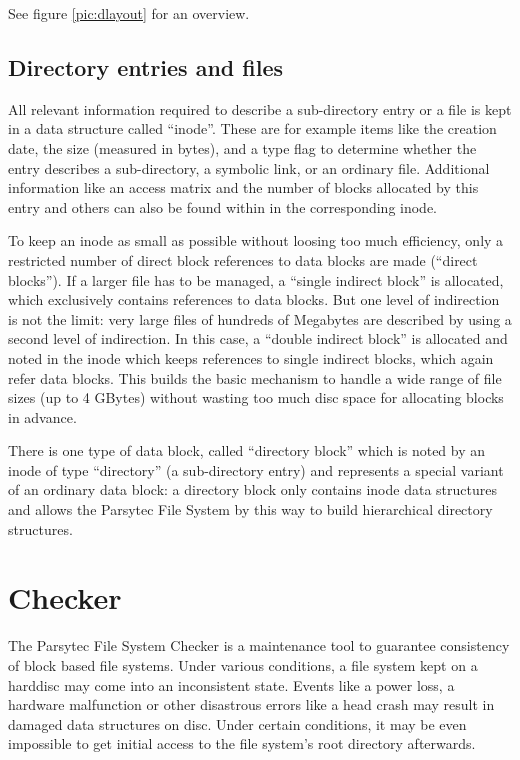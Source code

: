 See figure \ref{pic:dlayout} for an overview.



\subsection{Directory entries and files}

All relevant information required to describe a sub-directory entry or a file
is kept in a data structure called ``\/inode''. These are for
example items like the creation date, the size (measured in bytes), and a type
flag to determine whether the entry describes a sub-directory, a symbolic
link, or an ordinary file. Additional information like an access matrix and
the number of blocks allocated by this entry and others can also be found
within in the corresponding inode.

To keep an inode as small as possible without loosing too much efficiency, 
only a restricted number of direct block references to data blocks are made
(``direct blocks''). If a larger file has to be managed,
a ``single indirect block'' is allocated, which
exclusively contains references to data blocks. But one level of indirection
is not the limit: very large files of hundreds of Megabytes are described by
using a second level of indirection. In this case, a 
``double indirect block'' is allocated and noted
in the inode which keeps references to single indirect blocks, which again
refer data blocks. This builds the basic mechanism to handle a wide range of
file sizes (up to 4 GBytes) without wasting too much disc space for allocating
blocks in advance.

There is one type of data block, called
``directory block'' which is noted by an 
inode of type ``directory'' (a sub-directory entry) and represents a special 
variant of an ordinary data block: a directory block only contains inode data
structures and allows the Parsytec File System by this way to build
hierarchical directory structures.

\section{Checker}

The Parsytec File System Checker is a maintenance tool to guarantee 
consistency of block based file systems. Under various conditions, a file system
kept on a harddisc may come into an inconsistent state. Events like a power 
loss, a hardware malfunction or other disastrous errors like a head crash may
result in damaged data structures on disc. Under certain conditions, it may be 
even impossible to get initial access to the file system's root directory 
afterwards.

